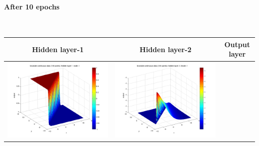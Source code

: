 \documentclass[fleqn]{article}
\newcommand{\myparagraph}[1]{\paragraph{#1}\mbox{}\\}
\begin{document}
\myparagraph{After 10 epochs}
\begin{center}
  \begin{longtable}{ c | c | r }
	\multicolumn{1}{c}{Hidden layer-1 } & 
	\multicolumn{1}{c}{Hidden layer-2 } & 
	\multicolumn{1}{c}{Output layer} \\
    \hline
    \includegraphics[scale=0.25]{./pics/bivariate100/_2_4/_2_4_epoch_10_hidden layer 1 :1}  &  \includegraphics[scale=0.25]{./pics/bivariate100/_2_4/_2_4_epoch_10_hidden layer 2 :21} &  \\ 

\end{longtable}
\end{center}
\end{document}
